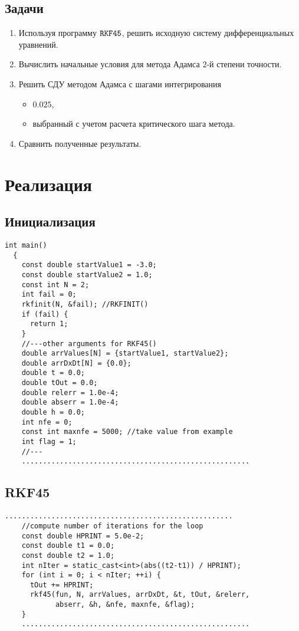 \documentclass[a4paper,11pt]{article}
\begin{document}
\subsection{Задачи}
\begin{enumerate}
  \item Используя программу $\verb|RKF45|$, решить исходную систему дифференциальных уравнений.
  \item Вычислить начальные условия для метода Адамса $2$-й степени точности.
  \item Решить СДУ методом Адамса с шагами интегрирования
    \begin{itemize}
      \item $0.025$,
      \item выбранный с учетом расчета критического шага метода.
    \end{itemize}
    \item Сравнить полученные результаты.
\end{enumerate}
\newpage

\section{Реализация}
\subsection{Инициализация}
\begin{lstlisting}[label=start, caption=Starting values]
  int main()
  {
    const double startValue1 = -3.0;
    const double startValue2 = 1.0;
    const int N = 2;
    int fail = 0;
    rkfinit(N, &fail); //RKFINIT()
    if (fail) {
      return 1;
    }
    //---other arguments for RKF45()
    double arrValues[N] = {startValue1, startValue2};
    double arrDxDt[N] = {0.0};
    double t = 0.0;
    double tOut = 0.0;
    double relerr = 1.0e-4;
    double abserr = 1.0e-4;
    double h = 0.0;
    int nfe = 0;
    const int maxnfe = 5000; //take value from example
    int flag = 1;
    //---
    ......................................................
\end{lstlisting}

\subsection{RKF45}
\begin{lstlisting}[label=rkf45, caption=RKF45]
    ......................................................
    //compute number of iterations for the loop
    const double HPRINT = 5.0e-2;
    const double t1 = 0.0;
    const double t2 = 1.0;
    int nIter = static_cast<int>(abs((t2-t1)) / HPRINT);
    for (int i = 0; i < nIter; ++i) {
      tOut += HPRINT;
      rkf45(fun, N, arrValues, arrDxDt, &t, tOut, &relerr,
            abserr, &h, &nfe, maxnfe, &flag);
    }
    ......................................................
\end{lstlisting}
\newpage
\end{document}
